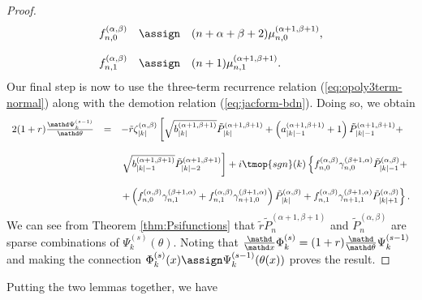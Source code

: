\begin{proof}
\[\begin{array}{lll}
       f_{n, 0}^{(\alpha, \beta)} & \assign & (n + \alpha + \beta + 2) \mu_{n,
       0}^{(\alpha + 1, \beta + 1)},\\
       &  & \\
       f_{n, 1}^{(\alpha, \beta)} & \assign & (n + 1) \mu_{n, 1}^{(\alpha + 1,
       \beta + 1)} .
     \end{array} \]
  Our final step is now to use the three-term recurrence relation
  (\ref{eq:opoly3term-normal}) along with the demotion relation
  (\ref{eq:jacform-bdn}). Doing so, we obtain
  \[ \begin{array}{lll}
       2 (1 + r) \frac{\mathd \Psi_k^{(s - 1)}}{\mathd \theta} & = & -
       \tilde{r} \zeta_{|k|}^{(\alpha, \beta)}  \left[ \sqrt{b_{|k|}^{(\alpha
       + 1, \beta + 1)}} \tilde{P}_{|k|}^{(\alpha + 1, \beta + 1)} + \left(
       a_{|k| - 1}^{(\alpha + 1, \beta + 1)} + 1 \right) \tilde{P}_{|k| -
       1}^{(\alpha + 1, \beta + 1)} + \right.\\
       &  & \\
       &  & \left. \sqrt{b_{|k| - 1}^{(\alpha + 1, \beta + 1)}}
       \tilde{P}_{|k| - 2}^{(\alpha + 1, \beta + 1)} \right] + i \tmop{sgn}
       (k) \left\{ f_{n, 0}^{(\alpha, \beta)} \gamma_{n, 0}^{(\beta + 1,
       \alpha)} \tilde{P}_{|k| - 1}^{(\alpha, \beta)} + \right.\\
       &  & \\
       &  & \left. + \left( f_{n, 0}^{(\alpha, \beta)} \gamma_{n, 1}^{(\beta
       + 1, \alpha)} + f_{n, 1}^{(\alpha, \beta)} \gamma_{n + 1, 0}^{(\beta +
       1, \alpha)} \right)  \tilde{P}_{|k|}^{(\alpha, \beta)} + f^{(\alpha,
       \beta)}_{n, 1} \gamma_{n + 1, 1}^{(\beta + 1, \alpha)} \tilde{P}_{|k| +
       1}^{(\alpha, \beta)} \right\} .
     \end{array} \]
  We can see from Theorem \ref{thm:Psifunctions} that $\tilde{r} 
  \tilde{P}_n^{(\alpha + 1, \beta + 1)}$ and $\tilde{P}_n^{(\alpha, \beta)}$
  are sparse combinations of $\Psi_k^{(s)} (\theta)$. Noting that
  $\frac{\mathd}{\mathd x} \Phi_k^{(s)} = (1 + r) \frac{\mathd}{\mathd \theta}
  \Psi_k^{(s - 1)}$ and making the connection $\Phi_k^{(s)} (x) \assign
  \Psi_k^{(s - 1)} (\theta (x))$ proves the result.
  
  
\end{proof}

Putting the two lemmas together, we have

